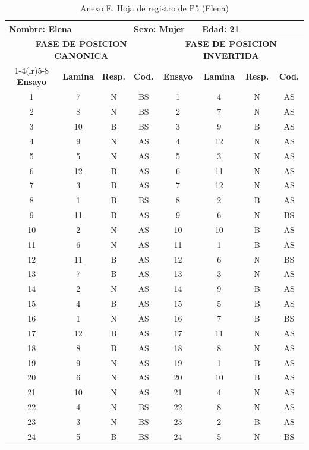\documentclass[stu, 12pt, letterpaper, donotrepeattitle, floatsintext, natbib]{apa7}
\begin{document}
\begin{table}[p]
\centering
\scriptsize
\caption{Anexo E. Hoja de registro de P5 (Elena)}
\label{anexo:p5}
\begin{tabular}{cccccccc}
\toprule
\multicolumn{3}{l}{\textbf{Nombre:} Elena} & \multicolumn{2}{l}{\textbf{Sexo:} Mujer} & \multicolumn{3}{l}{\textbf{Edad:} 21} \\
\midrule
\multicolumn{4}{c}{\textbf{FASE DE POSICION CANONICA}} & \multicolumn{4}{c}{\textbf{FASE DE POSICION INVERTIDA}} \\
\cmidrule(lr){1-4}\cmidrule(lr){5-8}
\textbf{Ensayo} & \textbf{Lamina} & \textbf{Resp.} & \textbf{Cod.} & \textbf{Ensayo} & \textbf{Lamina} & \textbf{Resp.} & \textbf{Cod.} \\
\midrule
1 & 7 & N & BS & 1 & 4 & N & AS \\
2 & 8 & N & BS & 2 & 7 & N & AS \\
3 & 10 & B & BS & 3 & 9 & B & AS \\
4 & 9 & N & AS & 4 & 12 & N & AS \\
5 & 5 & N & AS & 5 & 3 & N & AS \\
6 & 12 & B & AS & 6 & 11 & N & AS \\
7 & 3 & B & AS & 7 & 12 & N & AS \\
8 & 1 & B & BS & 8 & 2 & B & AS \\
9 & 11 & B & AS & 9 & 6 & N & BS \\
10 & 2 & N & AS & 10 & 10 & B & AS \\
11 & 6 & N & AS & 11 & 1 & B & AS \\
12 & 11 & B & AS & 12 & 6 & N & BS \\
13 & 7 & B & AS & 13 & 3 & N & AS \\
14 & 2 & N & AS & 14 & 9 & B & AS \\
15 & 4 & B & AS & 15 & 5 & B & AS \\
16 & 1 & N & AS & 16 & 7 & B & BS \\
17 & 12 & B & AS & 17 & 11 & N & AS \\
18 & 8 & B & AS & 18 & 8 & N & AS \\
19 & 9 & N & AS & 19 & 1 & B & AS \\
20 & 6 & N & AS & 20 & 10 & B & AS \\
21 & 10 & N & AS & 21 & 4 & N & AS \\
22 & 4 & N & BS & 22 & 8 & N & AS \\
23 & 3 & N & BS & 23 & 2 & B & AS \\
24 & 5 & B & BS & 24 & 5 & N & BS \\
\bottomrule
\end{tabular}
\end{table}
\end{document}
